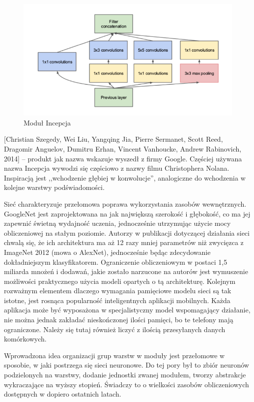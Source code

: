 \documentclass[12pt,a4paper,twoside,titlepage,openright]{book}
\begin{document}
\begin{figure}[ht]
	\centering
			\includegraphics[resolution=100, scale=0.7]{inceptionModule.png}
		\caption{Moduł Incepcja}
\end{figure}

[Christian Szegedy, Wei Liu, Yangqing Jia, Pierre Sermanet, Scott Reed, Dragomir Anguelov, Dumitru Erhan, Vincent Vanhoucke, Andrew Rabinovich, 2014] -- produkt jak nazwa wskazuje wyszedł z firmy Google. Częściej używana nazwa Incepcja wywodzi się częściowo z nazwy filmu Christophera Nolana. Inspiracją jest ,,wchodzenie głębiej w konwolucje'', analogiczne do wchodzenia w kolejne warstwy podświadomości. 

Sieć charakteryzuje przełomowa poprawa wykorzystania zasobów wewnętrznych. GoogleNet jest zaprojektowana na jak największą szerokość i głębokość, co ma jej zapewnić świetną wydajność uczenia, jednocześnie utrzymując użycie mocy obliczeniowej na stałym poziomie. Autorzy w publikacji dotyczącej działania sieci chwalą się, że ich architektura ma aż 12 razy mniej parametrów niż zwycięzca z ImageNet 2012 (mowa o AlexNet), jednocześnie będąc zdecydowanie dokładniejszym klasyfikatorem. Ograniczenie obliczeniowym w postaci 1,5 miliarda mnożeń i dodawań, jakie zostało narzucone na autorów jest wymuszenie możliwości praktycznego użycia modeli opartych o tą architekturę. Kolejnym rozważnym elementem dlaczego wymagania pamięciowe modelu sieci są tak istotne, jest rosnąca popularność inteligentnych aplikacji mobilnych. Każda aplikacja może być wyposażona w specjalistyczny model wspomagający działanie, nie można jednak zakładać nieskończonej ilości pamięci, bo te telefony mają ograniczone. Należy się tutaj również liczyć z ilością przesyłanych danych komórkowych. 

Wprowadzona idea organizacji grup warstw w moduły jest przełomowe w sposobie, w jaki postrzega się sieci neuronowe. Do tej pory był to zbiór neuronów podzielonych na warstwy, dodanie jednostki zwanej modułem, tworzy abstrakcje wykraczające na wyższy stopień. Świadczy to o wielkości zasobów obliczeniowych dostępnych w dopiero ostatnich latach.
\end{document}
